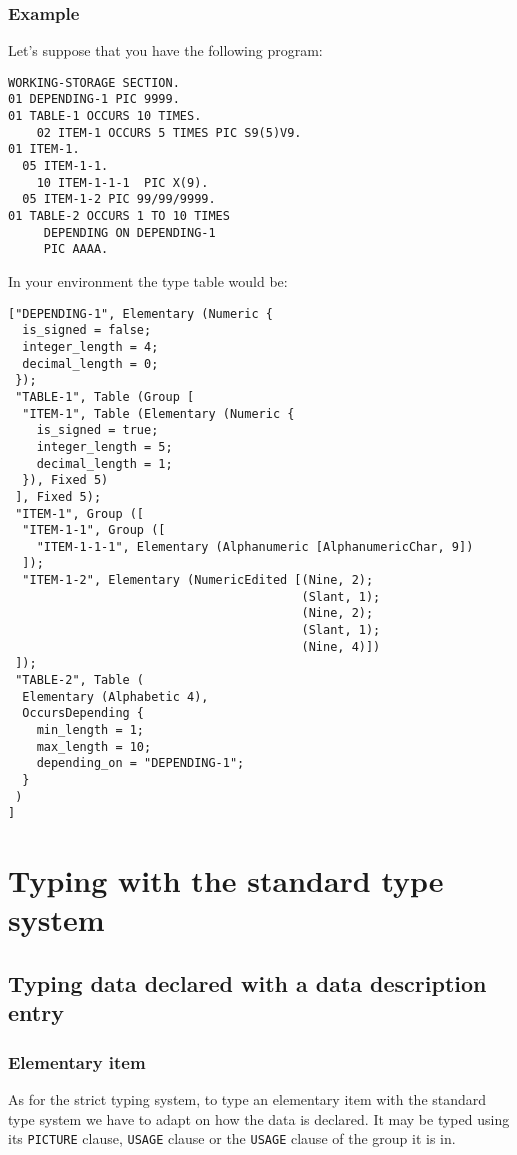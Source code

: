 \documentclass[a4paper,10pt]{article}
\newcommand{\usagec}[1]{\texttt{USAGE} clause#1}
\newcommand{\picturec}[1]{\texttt{PICTURE} clause#1}
\begin{document}
\subsubsection{Example}
Let's suppose that you have the following program: 
\begin{verbatim}
WORKING-STORAGE SECTION.
01 DEPENDING-1 PIC 9999.
01 TABLE-1 OCCURS 10 TIMES.
    02 ITEM-1 OCCURS 5 TIMES PIC S9(5)V9.
01 ITEM-1.
  05 ITEM-1-1.
    10 ITEM-1-1-1  PIC X(9).
  05 ITEM-1-2 PIC 99/99/9999.
01 TABLE-2 OCCURS 1 TO 10 TIMES
     DEPENDING ON DEPENDING-1
     PIC AAAA.
\end{verbatim}
In your environment the type table would be:
\begin{verbatim}
["DEPENDING-1", Elementary (Numeric {
  is_signed = false;
  integer_length = 4;
  decimal_length = 0;
 });
 "TABLE-1", Table (Group [
  "ITEM-1", Table (Elementary (Numeric {
    is_signed = true;
    integer_length = 5;
    decimal_length = 1;
  }), Fixed 5)
 ], Fixed 5);
 "ITEM-1", Group ([
  "ITEM-1-1", Group ([
    "ITEM-1-1-1", Elementary (Alphanumeric [AlphanumericChar, 9])
  ]);
  "ITEM-1-2", Elementary (NumericEdited [(Nine, 2);
                                         (Slant, 1);
                                         (Nine, 2);
                                         (Slant, 1);
                                         (Nine, 4)])
 ]);
 "TABLE-2", Table (
  Elementary (Alphabetic 4),
  OccursDepending {
    min_length = 1;
    max_length = 10;
    depending_on = "DEPENDING-1";
  }
 )
]
\end{verbatim}
\pagebreak

\section{Typing with the standard type system}
\subsection{Typing data declared with a data description entry}
\subsubsection{Elementary item}
As for the strict typing system, to type an elementary item with the standard type system we have
to adapt on how the data is declared. It may be typed using its \picturec{}, \usagec{} or the
\usagec{} of the group it is in.
\end{document}
